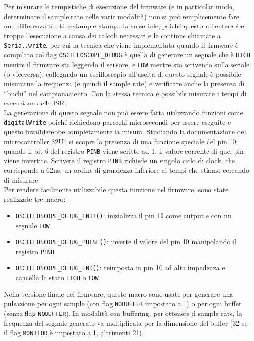 Per misurare le tempistiche di esecuzione del firmware (e in particolar modo, determinare il sample rate nelle varie modalità) non si può semplicemente fare una differenza tra timestamp e stamparla su seriale, poiché questo rallenterebbe troppo l'esecuzione a causa dei calcoli necessari e le continue chiamate a \texttt{Serial.write}, per cui la tecnica che viene implementata quando il firmware è compilato col flag \texttt{OSCILLOSCOPE\_DEBUG} è quella di generare un segnale che è \texttt{HIGH} mentre il firmware sta leggendo il sensore, e \texttt{LOW} mentre sta scrivendo sulla seriale (o viceversa); collegando un oscilloscopio all'uscita di questo segnale è possibile misurarne la frequenza (e quindi il sample rate) e verificare anche la presenza di ``buchi'' nel campionamento. Con la stessa tecnica è possibile misurare i tempi di esecuzione delle ISR.\\
La generazione di questo segnale non può essere fatta utilizzando funzioni come \texttt{digitalWrite} poiché richiedono parecchi microsecondi per essere eseguite e questo invaliderebbe completamente la misura. Studiando la documentazione del microcontroller 32U4 si scopre la presenza di una funzione speciale del pin 10: quando il bit 6 del registro \texttt{PINB} viene scritto ad 1, il valore corrente di quel pin viene invertito\cite{atmega32u4_datasheet}. Scrivere il registro \texttt{PINB} richiede un singolo ciclo di clock, che corrisponde a 62ns, un ordine di grandezza inferiore ai tempi che stiamo cercando di misurare.\\
Per rendere facilmente utilizzabile questa funzione nel firmware, sono state realizzate tre macro:
\begin{itemize}
	\item \texttt{OSCILLOSCOPE\_DEBUG\_INIT()}: inizializza il pin 10 come output e con un segnale \texttt{LOW}
	\item \texttt{OSCILLOSCOPE\_DEBUG\_PULSE()}: inverte il valore del pin 10 manipolando il registro \texttt{PINB}
	\item \texttt{OSCILLOSCOPE\_DEBUG\_END()}: reimposta in pin 10 ad alta impedenza e cancella lo stato \texttt{HIGH} o \texttt{LOW}
\end{itemize}
Nella versione finale del firmware, queste macro sono usate per generare una pulsazione per ogni sample (con flag \texttt{NOBUFFER} impostato a 1) o per ogni buffer (senza flag \texttt{NOBUFFER}). In modalità con buffering, per ottenere il sample rate, la frequenza del segnale generato va moltiplicata per la dimensione del buffer (32 se il flag \texttt{MONITOR} è impostato a 1, altrimenti 21).

